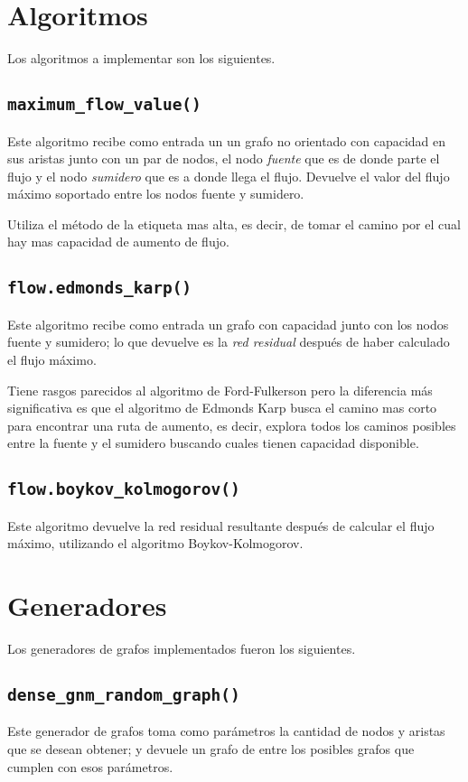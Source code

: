 \documentclass{article}
\begin{document}
\section{Algoritmos}
Los algoritmos a implementar son los siguientes.
\subsection*{\texttt{maximum\_flow\_value()}}
Este algoritmo recibe como entrada un un grafo no orientado con capacidad en sus aristas junto con un par de nodos, el nodo \textit{fuente} que es de donde parte el flujo y el nodo \textit{sumidero} que es a donde llega el flujo. Devuelve el valor del flujo máximo soportado entre los nodos fuente y sumidero.

Utiliza el método de la etiqueta mas alta, es decir, de tomar el camino por el cual hay mas capacidad de aumento de flujo.

\subsection*{\texttt{flow.edmonds\_karp()}}
Este algoritmo recibe como entrada un grafo con capacidad junto con los nodos fuente y sumidero; lo que devuelve es la \textit{red residual} después de haber calculado el flujo máximo.

Tiene rasgos parecidos al algoritmo de Ford-Fulkerson pero la diferencia más significativa es que el algoritmo de Edmonds Karp busca el camino mas corto para encontrar una ruta de aumento, es decir, explora todos los caminos posibles entre la fuente y el sumidero buscando cuales tienen capacidad disponible. 

\subsection*{\texttt{flow.boykov\_kolmogorov()}}
Este algoritmo devuelve la red residual resultante después de calcular el flujo máximo, utilizando el algoritmo  Boykov-Kolmogorov.
\section{Generadores}
Los generadores de grafos implementados fueron los siguientes.

\subsection*{\texttt{dense\_gnm\_random\_graph()}}
Este generador de grafos toma como parámetros la cantidad de nodos y aristas que se desean obtener; y devuele un grafo de entre los posibles grafos que cumplen con esos parámetros.
\end{document}
